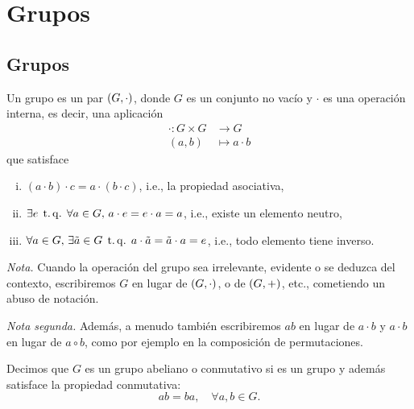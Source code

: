 \chapter{Grupos}

\section{Grupos}

\begin{defi}[grupo]
    Un grupo es un par $\left( G, \cdot \right)$, donde $G$ es un conjunto no vacío y $\cdot$ es una operación interna, es decir, una aplicación
    \[
        \begin{aligned}
            \cdot \colon G \times G &\to G \\
            (a, b) &\mapsto a \cdot b
        \end{aligned}
    \]
    que satisface
    \begin{enumerate}[i)]
        \item $(a\cdot b)\cdot c = a\cdot (b\cdot c)$, i.e., la propiedad asociativa,
        \item $\exists e \operatorname{\;t.q.\;} \forall a \in G, \, a\cdot e = e\cdot a = a$, i.e., existe un elemento neutro,
        \item $\forall a \in G, \, \exists \tilde{a} \in G \operatorname{\;t.q.\;} a \cdot \tilde{a} = \tilde{a}\cdot a = e$, i.e., todo elemento tiene inverso.
    \end{enumerate}
    \emph{Nota.} Cuando la operación del grupo sea irrelevante, evidente o se deduzca del contexto, escribiremos $G$ en lugar de $\left( G, \cdot\right)$, o de $\left( G, +\right)$, etc., cometiendo un abuso de notación.
    
    \vspace{1.15ex} %
    
    \noindent \emph{Nota segunda.} Además, a menudo también escribiremos $ab$ en lugar de $a\cdot b$ y $a\cdot b$ en lugar de $a\circ b$, como por ejemplo en la composición de permutaciones.
\end{defi}

\begin{defi}
    Decimos que $G$ es un grupo abeliano o conmutativo si es un grupo y además satisface la propiedad conmutativa:
    \[
        ab = ba, \quad \forall a, b \in G.
    \]
\end{defi}

